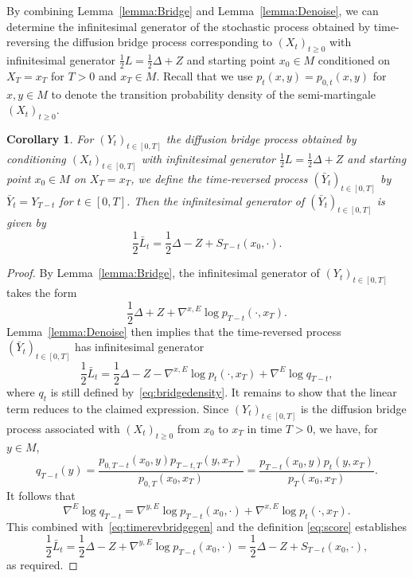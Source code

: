 \documentclass[10pt]{amsart}
\newcounter{dummy} \numberwithin{dummy}{section}
\newtheorem{corollary}[dummy]{Corollary}
\theoremstyle{remark}
\numberwithin{equation}{section}
\begin{document}
By combining Lemma~\ref{lemma:Bridge} and Lemma~\ref{lemma:Denoise}, we can determine the infinitesimal generator of the stochastic process obtained by time-reversing the diffusion bridge process corresponding to $(X_t)_{t\geq 0}$ with infinitesimal generator $\frac{1}{2} L = \frac{1}{2} \Delta + Z$ and starting point $x_0\in M$ conditioned on $X_T=x_T$ for $T>0$ and $x_T\in M$. Recall that we use $p_t(x,y) = p_{0,t}(x,y)$ for $x,y\in M$ to denote the transition probability density of the semi-martingale $(X_t)_{t\geq 0}$.
\begin{corollary}\label{cor:timereversedbridge}
    For $(Y_t)_{t\in[0,T]}$ the diffusion bridge process obtained by conditioning $(X_t)_{t\in[0,T]}$ with infinitesimal generator $\frac{1}{2} L = \frac{1}{2} \Delta + Z$ and starting point $x_0\in M$ on $X_T=x_T$, we define the time-reversed process $(\bar{Y}_{t})_{t\in[0,T]}$ by $\bar{Y}_{t} = Y_{T-t}$ for $t\in[0,T]$. Then the infinitesimal generator of $(\bar{Y}_{t})_{t\in[0,T]}$ is given by
    \begin{equation*}
        \frac{1}{2}\bar{L}_t
        =\frac{1}{2}\Delta-Z+S_{T-t}(x_0,\cdot).
    \end{equation*}
\end{corollary}

\begin{proof}
    By Lemma~\ref{lemma:Bridge}, the infinitesimal generator of $(Y_t)_{t\in[0,T]}$ takes the form
    \begin{displaymath}
        \frac{1}{2} \Delta +Z + \nabla^{x,E} \log p_{T-t}(\cdot , x_T).
    \end{displaymath}
    Lemma~\ref{lemma:Denoise} then implies that the time-reversed process $(\bar{Y}_{t})_{t\in[0,T]}$ has infinitesimal generator
    \begin{equation}\label{eq:timerevbridgegen}
        \frac{1}{2}\bar{L}_t
        =\frac{1}{2}\Delta-Z-\nabla^{x,E}\log p_{t}(\cdot,x_T)
        +\nabla^E\log q_{T-t},
    \end{equation}
    where $q_t$ is still defined by~\eqref{eq:bridgedensity}. It remains to show that the linear term reduces to the claimed expression. Since $(Y_t)_{t\in[0,T]}$ is the diffusion bridge process associated with $(X_t)_{t\geq 0}$ from $x_0$ to $x_T$ in time $T>0$, we have, for $y\in M$,
    \begin{displaymath}
        q_{T-t}(y)
        =\frac{p_{0,T-t}(x_0,y)p_{T-t,T}(y,x_T)}{p_{0,T}(x_0,x_T)}
        =\frac{p_{T-t}(x_0,y)p_{t}(y,x_T)}{p_{T}(x_0,x_T)}.
    \end{displaymath}
    It follows that
    \begin{displaymath}
        \nabla^E\log q_{T-t}
        =\nabla^{y,E} \log p_{T-t}(x_0,\cdot)+\nabla^{x,E} \log p_{t}(\cdot,x_T).
    \end{displaymath}
    This combined with~\eqref{eq:timerevbridgegen} and the definition \eqref{eq:score} establishes
    \begin{displaymath}
        \frac{1}{2}\bar{L}_t
        =\frac{1}{2}\Delta-Z+\nabla^{y,E} \log p_{T-t}(x_0,\cdot)
        = \frac{1}{2} \Delta - Z + S_{T-t}(x_0,\cdot),
    \end{displaymath}
    as required.
\end{proof}
\end{document}
